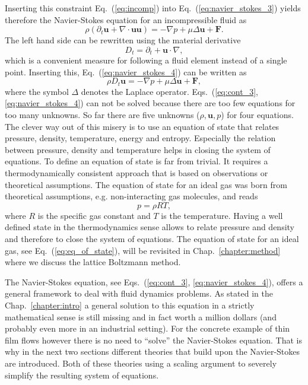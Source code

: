 Inserting this constraint Eq.~(\ref{eq:incomp}) into Eq.~(\ref{eq:navier_stokes_3}) yields therefore the Navier-Stokes equation for an incompressible fluid as
\begin{equation}\label{eq:navier_stokes_4}
    \rho(\partial_t\mathbf{u} + \nabla\cdot\mathbf{u}\mathbf{u}) = - \nabla p + \mu\Delta\mathbf{u} + \textbf{F}.
\end{equation}
The left hand side can be rewritten using the material derivative
\begin{equation}\label{eq:mat_dev}
    D_t = \partial_t + \mathbf{u}\cdot\nabla, 
\end{equation}
which is a convenient measure for following a fluid element instead of a single point.
Inserting this, Eq.~(\ref{eq:navier_stokes_4}) can be written as
\begin{equation}\label{eq:navier_stokes_fin}
    \rho D_t \mathbf{u} =  - \nabla p + \mu\Delta\mathbf{u} + \textbf{F},
\end{equation}
where the symbol $\Delta$ denotes the Laplace operator.
Eqs.~(\ref{eq:cont_3}, \ref{eq:navier_stokes_4}) can not be solved because there are too few equations for too many unknowns.
So far there are five unknowns ($\rho, \mathbf{u}, p$) for four equations.
The clever way out of this misery is to use an equation of state that relates pressure, density, temperature, energy and entropy.
Especially the relation between pressure, density and temperature helps in closing the system of equations.
To define an equation of state is far from trivial.
It requires a thermodynamically consistent approach that is based on observations or theoretical assumptions.
The equation of state for an ideal gas was born from theoretical assumptions, e.g. non-interacting gas molecules, and reads~\cite{schwabl2006statistical}
\begin{equation}\label{eq:eq_of_state}
    p = \rho R T,
\end{equation}
where $R$ is the specific gas constant and $T$ is the temperature.
Having a well defined state in the thermodynamics sense allows to relate pressure and density and therefore to close the system of equations.
The equation of state for an ideal gas, see Eq.~(\ref{eq:eq_of_state}), will be revisited in Chap.~\ref{chapter:method} where we discuss the lattice Boltzmann method.

The Navier-Stokes equation, see Eqs.~(\ref{eq:cont_3}, \ref{eq:navier_stokes_4}), offers a general framework to deal with fluid dynamics problems.
As stated in the Chap.~\ref{chapter:intro} a general solution to this equation in a strictly mathematical sense is still missing and in fact worth a million dollars (and probably even more in an industrial setting).
For the concrete example of thin film flows however there is no need to ``solve'' the Navier-Stokes equation.
That is why in the next two sections different theories that build upon the Navier-Stokes are introduced.
Both of these theories using a scaling argument to severely simplify the resulting system of equations.

